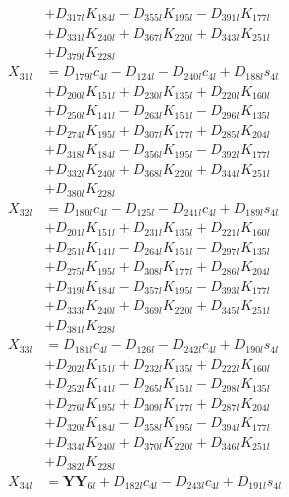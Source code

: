 \begin{multicols}{2}
\begin{align}
&+ D_{317l}K_{184l} - D_{355l}K_{195l} - D_{391l}K_{177l}  \nonumber \\
&+ D_{331l}K_{240l} + D_{367l}K_{220l} + D_{343l}K_{251l}  \nonumber \\
&+ D_{379l}K_{228l} \nonumber \\
X_{31l} &= D_{179l}c_{4l} - D_{124l} - D_{240l}c_{4l} + D_{188l}s_{4l}  \nonumber \\
&+ D_{200l}K_{151l} + D_{230l}K_{135l} + D_{220l}K_{160l}  \nonumber \\
&+ D_{250l}K_{141l} - D_{263l}K_{151l} - D_{296l}K_{135l}  \nonumber \\
&+ D_{274l}K_{195l} + D_{307l}K_{177l} + D_{285l}K_{204l}  \nonumber \\
&+ D_{318l}K_{184l} - D_{356l}K_{195l} - D_{392l}K_{177l}  \nonumber \\
&+ D_{332l}K_{240l} + D_{368l}K_{220l} + D_{344l}K_{251l}  \nonumber \\
&+ D_{380l}K_{228l} \nonumber \\
X_{32l} &= D_{180l}c_{4l} - D_{125l} - D_{241l}c_{4l} + D_{189l}s_{4l}  \nonumber \\
&+ D_{201l}K_{151l} + D_{231l}K_{135l} + D_{221l}K_{160l}  \nonumber \\
&+ D_{251l}K_{141l} - D_{264l}K_{151l} - D_{297l}K_{135l}  \nonumber \\
&+ D_{275l}K_{195l} + D_{308l}K_{177l} + D_{286l}K_{204l}  \nonumber \\
&+ D_{319l}K_{184l} - D_{357l}K_{195l} - D_{393l}K_{177l}  \nonumber \\
&+ D_{333l}K_{240l} + D_{369l}K_{220l} + D_{345l}K_{251l}  \nonumber \\
&+ D_{381l}K_{228l} \nonumber \\
X_{33l} &= D_{181l}c_{4l} - D_{126l} - D_{242l}c_{4l} + D_{190l}s_{4l}  \nonumber \\
&+ D_{202l}K_{151l} + D_{232l}K_{135l} + D_{222l}K_{160l}  \nonumber \\
&+ D_{252l}K_{141l} - D_{265l}K_{151l} - D_{298l}K_{135l}  \nonumber \\
&+ D_{276l}K_{195l} + D_{309l}K_{177l} + D_{287l}K_{204l}  \nonumber \\
&+ D_{320l}K_{184l} - D_{358l}K_{195l} - D_{394l}K_{177l}  \nonumber \\
&+ D_{334l}K_{240l} + D_{370l}K_{220l} + D_{346l}K_{251l}  \nonumber \\
&+ D_{382l}K_{228l} \nonumber \\
X_{34l} &= \mathbf{YY}_{6l} + D_{182l}c_{4l} - D_{243l}c_{4l} + D_{191l}s_{4l}  \nonumber \\

\end{align}
\end{multicols}
